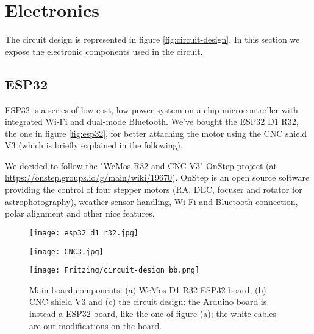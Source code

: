 \section{Electronics}
\label{sec:electronics}
The circuit design is represented in figure \ref{fig:circuit-design}.
In this section we expose the electronic components used in the circuit.

\subsection{ESP32}
ESP32 is a series of low-cost, low-power system on a chip microcontroller with integrated Wi-Fi and dual-mode Bluetooth.
We've bought the ESP32 D1 R32, the one in figure \ref{fig:esp32}, for better attaching the motor using the CNC shield V3 (which is briefly explained in the following).

We decided to follow the "WeMos R32 and CNC V3" OnStep project (at \url{https://onstep.groups.io/g/main/wiki/19670}).
OnStep is an open source software providing the control of four stepper motors (RA, DEC, focuser and rotator for astrophotography), weather sensor handling, Wi-Fi and Bluetooth connection, polar alignment and other nice features.

\begin{figure*}
    \begin{minipage}[c][10cm][c]{0.35\textwidth}
        \centering
        \vspace*{\fill}
        \texttt{[image: esp32\_d1\_r32.jpg]}
        \label{fig:esp32}
        
        \texttt{[image: CNC3.jpg]}
        \label{fig:cnc3}
    \end{minipage}
    \begin{minipage}[c][10cm][t]{0.5\textwidth}
        \vspace*{\fill}
        \centering
        \texttt{[image: Fritzing/circuit-design\_bb.png]}
        \label{fig:circuit-design}
    \end{minipage}
    \caption{Main board components: (a) WeMos D1 R32 ESP32 board, (b) CNC shield V3 and (c) the circuit design: the Arduino board is instead a ESP32 board, like the one of figure (a); the white cables are our modifications on the board.}
    \label{fig:electronics}
\end{figure*}

